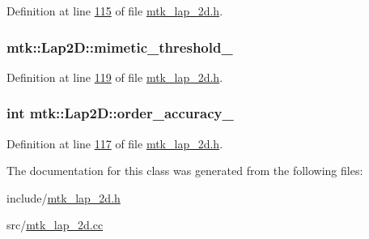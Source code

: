 Definition at line \hyperlink{mtk__lap__2d_8h_source_l00115}{115} of file \hyperlink{mtk__lap__2d_8h_source}{mtk\+\_\+lap\+\_\+2d.\+h}.

\hypertarget{classmtk_1_1Lap2D_a5501bd196f7307f64d6fa58da070196e}{
\subsubsection[{mimetic\+\_\+threshold\+\_\+}]{ mtk\+::\+Lap2\+D\+::mimetic\+\_\+threshold\+\_\+\hspace{0.3cm}{\ttfamily [private]}}}\label{classmtk_1_1Lap2D_a5501bd196f7307f64d6fa58da070196e}


Definition at line \hyperlink{mtk__lap__2d_8h_source_l00119}{119} of file \hyperlink{mtk__lap__2d_8h_source}{mtk\+\_\+lap\+\_\+2d.\+h}.

\hypertarget{classmtk_1_1Lap2D_a9c4fdfe20a093b19f3b3f7ff0c49f560}{
\subsubsection[{order\+\_\+accuracy\+\_\+}]{\setlength{\rightskip}{0pt plus 5cm}int mtk\+::\+Lap2\+D\+::order\+\_\+accuracy\+\_\+\hspace{0.3cm}{\ttfamily [private]}}}\label{classmtk_1_1Lap2D_a9c4fdfe20a093b19f3b3f7ff0c49f560}


Definition at line \hyperlink{mtk__lap__2d_8h_source_l00117}{117} of file \hyperlink{mtk__lap__2d_8h_source}{mtk\+\_\+lap\+\_\+2d.\+h}.



The documentation for this class was generated from the following files\+:\begin{DoxyCompactItemize}
\item 
include/\hyperlink{mtk__lap__2d_8h}{mtk\+\_\+lap\+\_\+2d.\+h}\item 
src/\hyperlink{mtk__lap__2d_8cc}{mtk\+\_\+lap\+\_\+2d.\+cc}\end{DoxyCompactItemize}
